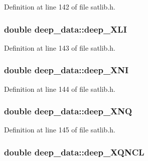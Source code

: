 Definition at line 142 of file satlib.\-h.

\hypertarget{structdeep__data_ae2c68ea75bc04a2ddd058500839946b3}{
\subsubsection[{deep\-\_\-\-X\-L\-I}]{\setlength{\rightskip}{0pt plus 5cm}double deep\-\_\-data\-::deep\-\_\-\-X\-L\-I}}\label{structdeep__data_ae2c68ea75bc04a2ddd058500839946b3}


Definition at line 143 of file satlib.\-h.

\hypertarget{structdeep__data_a7bc4544fec52dfd21f3189db105659b1}{
\subsubsection[{deep\-\_\-\-X\-N\-I}]{\setlength{\rightskip}{0pt plus 5cm}double deep\-\_\-data\-::deep\-\_\-\-X\-N\-I}}\label{structdeep__data_a7bc4544fec52dfd21f3189db105659b1}


Definition at line 144 of file satlib.\-h.

\hypertarget{structdeep__data_a9d7f9bc3c1619481c324ea68cd9ddedd}{
\subsubsection[{deep\-\_\-\-X\-N\-Q}]{\setlength{\rightskip}{0pt plus 5cm}double deep\-\_\-data\-::deep\-\_\-\-X\-N\-Q}}\label{structdeep__data_a9d7f9bc3c1619481c324ea68cd9ddedd}


Definition at line 145 of file satlib.\-h.

\hypertarget{structdeep__data_abc6885cb9b8be05cf0807c87f99c6db3}{
\subsubsection[{deep\-\_\-\-X\-Q\-N\-C\-L}]{\setlength{\rightskip}{0pt plus 5cm}double deep\-\_\-data\-::deep\-\_\-\-X\-Q\-N\-C\-L}}\label{structdeep__data_abc6885cb9b8be05cf0807c87f99c6db3}



